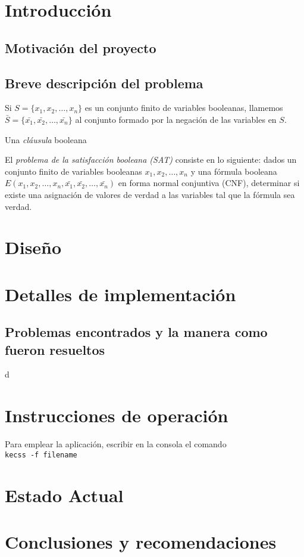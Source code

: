 \documentclass[12pt,lettersize]{article}
\begin{document}
\section{Introducción}

\subsection{Motivación del proyecto}

\subsection{Breve descripción del problema} 
Si $S=\{x_1,x_2,\ldots,x_n\}$ es un conjunto finito de variables booleanas,
llamemos $\bar{S}=\{\bar{x_1},\bar{x_2},\ldots,\bar{x_n}\}$ al conjunto formado
por la negación de las variables en $S$. 


Una \emph{cláusula} booleana

El \emph{problema de la satisfacción booleana (SAT)} consiste en lo siguiente:
dados un conjunto finito de variables booleanas $x_1,x_2,\ldots,x_n$ y una
fórmula booleana $E(x_1,x_2,\ldots,x_n,\bar{x_1},\bar{x_2},\ldots,\bar{x_n})$ en
forma normal conjuntiva (CNF), determinar si existe una asignación de valores de
verdad a las variables tal que la fórmula sea verdad.

\section{Diseño}

\section{Detalles de implementación}


\subsection{Problemas encontrados y la manera como fueron resueltos}


\begin{texttt}
d
\end{texttt}

\section{Instrucciones de operación}
Para emplear la aplicación, escribir en la consola el comando
\\ \texttt{kecss -f filename}
\section{Estado Actual}

\section{Conclusiones y recomendaciones}
\end{document}
